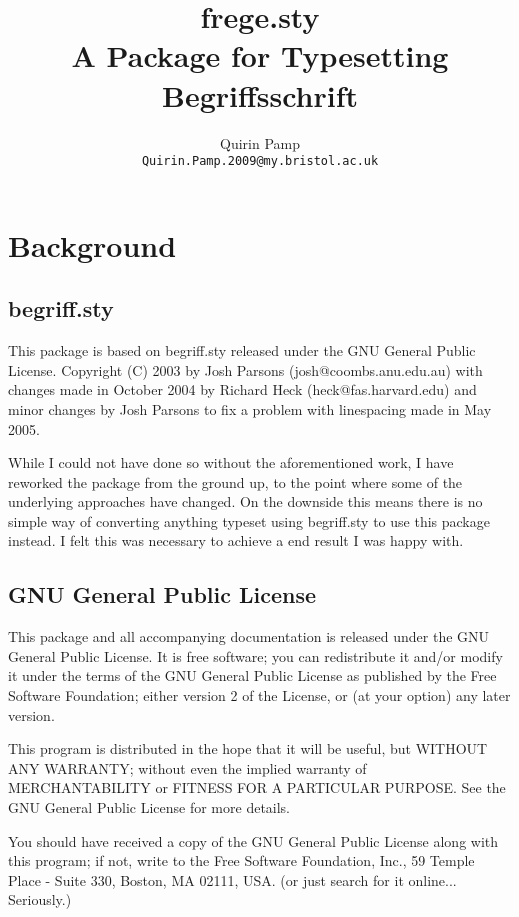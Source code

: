\documentclass[12pt]{article}
\title{frege.sty \\ A \LaTeXe Package for Typesetting Begriffsschrift}
\author{Quirin Pamp \\ \texttt{Quirin.Pamp.2009@my.bristol.ac.uk}}
\begin{document}
\maketitle
\section{Background}
\subsection{begriff.sty}
  This package is based on begriff.sty released under the GNU General Public 
  License. 
  Copyright (C) 2003 by Josh Parsons (josh@coombs.anu.edu.au) with changes made in 
  October 2004 by Richard Heck (heck@fas.harvard.edu) and minor changes by Josh 
  Parsons to fix a problem with linespacing made in May 2005.

  While I could not have done so without the aforementioned work, I have reworked the 
  package from the ground up, to the point where some of the underlying approaches 
  have changed. On the downside this means there is no simple way of converting 
  anything typeset using begriff.sty to use this package instead. I felt this was 
  necessary to achieve a end result I was happy with.

\subsection{GNU General Public License}
  This package and all accompanying documentation is released under the GNU General 
  Public License. It is free software; you can redistribute it and/or modify it under 
  the terms of the GNU General Public License as published by the Free Software 
  Foundation; either version 2 of the License, or (at your option) any later version.

  This program is distributed in the hope that it will be useful, but WITHOUT ANY 
  WARRANTY; without even the implied warranty of MERCHANTABILITY or FITNESS FOR A 
  PARTICULAR PURPOSE. See the GNU General Public License for more details.

  You should have received a copy of the GNU General Public License along with this 
  program; if not, write to the Free Software Foundation, Inc., 59 Temple Place - 
  Suite 330, Boston, MA 02111, USA. (or just search for it online... Seriously.)
\end{document}
